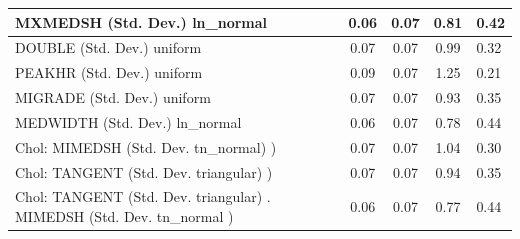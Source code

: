 \begin{table}
\begin{center}
\begin{tabular}{|l|l|c|c|c|l|}
			\hline
			MXMEDSH (Std. Dev.) ln_normal &  & 0.06 & 0.07 & 0.81 & 0.42 \\
			\hline
			DOUBLE (Std. Dev.) uniform &  & 0.07 & 0.07 & 0.99 & 0.32 \\
			\hline
			PEAKHR (Std. Dev.) uniform &  & 0.09 & 0.07 & 1.25 & 0.21 \\
			\hline
			MIGRADE (Std. Dev.) uniform &  & 0.07 & 0.07 & 0.93 & 0.35 \\
			\hline
			MEDWIDTH (Std. Dev.) ln_normal &  & 0.06 & 0.07 & 0.78 & 0.44 \\
			\hline
			 Chol: MIMEDSH (Std. Dev. tn_normal) ) &  & 0.07 & 0.07 & 1.04 & 0.30 \\
			\hline
			 Chol: TANGENT (Std. Dev. triangular) ) &  & 0.07 & 0.07 & 0.94 & 0.35 \\
			\hline
			 Chol: TANGENT (Std. Dev. triangular) . MIMEDSH (Std. Dev.   tn_normal ) &  & 0.06 & 0.07 & 0.77 & 0.44 \\
			\hline
		\end{tabular}
	\end{center}
\end{table}